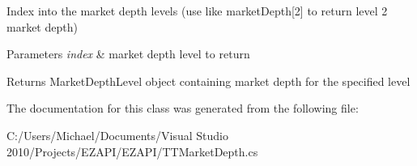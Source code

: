 Index into the market depth levels (use like market\-Depth\mbox{[}2\mbox{]} to return level 2 market depth) 


\begin{DoxyParams}{Parameters}
{\em index} & market depth level to return\\
\hline
\end{DoxyParams}
\begin{DoxyReturn}{Returns}
Market\-Depth\-Level object containing market depth for the specified level
\end{DoxyReturn}


The documentation for this class was generated from the following file\-:\begin{DoxyCompactItemize}
\item 
C\-:/\-Users/\-Michael/\-Documents/\-Visual Studio 2010/\-Projects/\-E\-Z\-A\-P\-I/\-E\-Z\-A\-P\-I/T\-T\-Market\-Depth.\-cs\end{DoxyCompactItemize}
